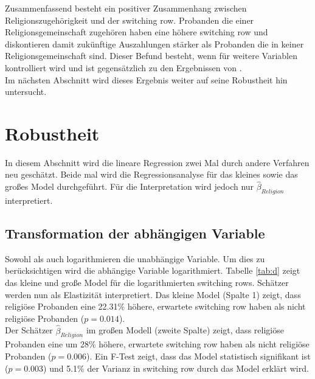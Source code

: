 \documentclass[11pt,a4paper]{article}
\begin{document}


Zusammenfassend besteht ein positiver Zusammenhang zwischen Religionszugehörigkeit und der switching row. Probanden die einer Religionsgemeinschaft zugehören haben eine höhere switching row und  diskontieren damit zukünftige Auszahlungen stärker als Probanden die in keiner Religionsgemeinschaft sind. Dieser Befund besteht, wenn für weitere Variablen kontrolliert wird und ist gegensätzlich zu den Ergebnissen von \textcite{carter2012religious,benjamin2013religious, thornton2015divine}.\\

Im nächsten Abschnitt wird dieses Ergebnis weiter auf seine Robustheit hin untersucht. 

\section{Robustheit}
In diesem Abschnitt wird die lineare Regression zwei Mal durch andere Verfahren neu geschätzt. Beide mal wird die Regressionsanalyse für das kleines sowie das großes Model durchgeführt. Für die Interpretation wird jedoch nur $\hat{\beta}_{Religion}$ interpretiert. 
\subsection{Transformation der abhängigen Variable}
Sowohl \textcite{benjamin2013religious} als auch \textcite{thornton2015divine} logarithmieren die unabhängige Variable. Um dies zu berücksichtigen wird die abhängige Variable logarithmiert. Tabelle \ref{tab:d} zeigt das kleine und große Model für die logarithmierten switching rows. Schätzer werden  nun als Elastizität interpretiert. Das kleine Model (Spalte 1) zeigt, dass religiöse Probanden eine 22.31\% höhere, erwartete switching row haben als nicht religiöse Probanden ($p = 0.014$).\\
Der Schätzer $\hat{\beta}_{Religion}$ im großen Modell (zweite Spalte) zeigt, dass religiöse Probanden eine um 28\% höhere, erwartete switching row haben als nicht religiöse Probanden ($p = 0.006$). Ein F-Test zeigt, dass das Model statistisch signifikant ist ($p = 0.003$) und 5.1\% der Varianz in switching row durch das Model erklärt wird.\\
\end{document}
